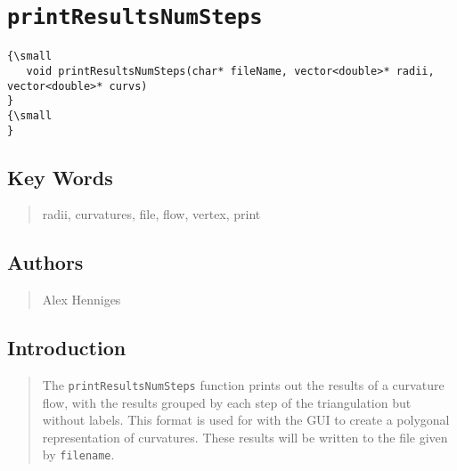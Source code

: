                       


\section*{\texttt{printResultsNumSteps}}

\label{f0}

\begin{quotation}
{\small }
\end{quotation}

\begin{verbatim}
{\small 
   void printResultsNumSteps(char* fileName, vector<double>* radii, vector<double>* curvs)
}
{\small    
}
\end{verbatim}

\subsection*{Key Words}

\begin{quotation}
radii, curvatures, file, flow, vertex, print
\end{quotation}

\subsection*{Authors}

\begin{quotation}
Alex Henniges
\end{quotation}

\subsection*{Introduction}

\begin{quotation}
The \texttt{printResultsNumSteps} function prints out the results of a
curvature flow, with the results grouped by each step of the triangulation
but without labels. This format is used for with the GUI to create a
polygonal representation of curvatures. These results will be written to the
file given by \texttt{filename}.
\end{quotation}

